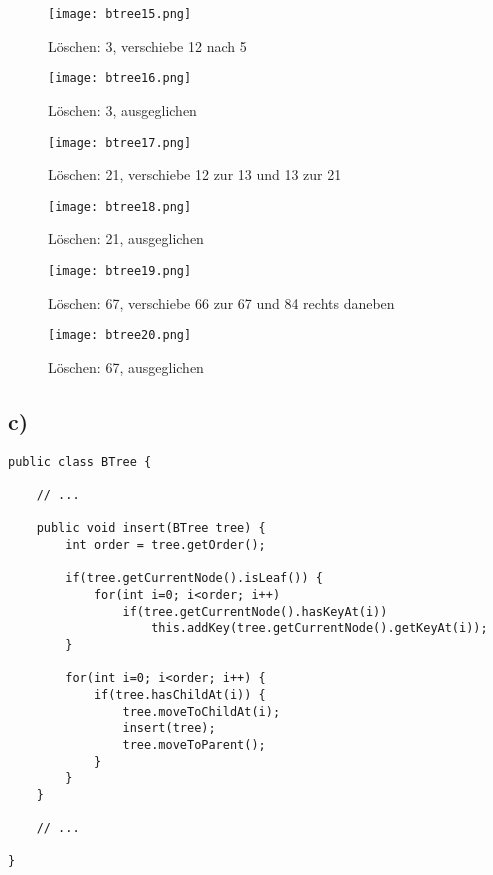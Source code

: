 \documentclass[a4paper]{article}
\begin{document}
\begin{figure}[!h]
	\begin{center}
		\texttt{[image: btree15.png]}
	\end{center}
	\caption{Löschen: 3, verschiebe 12 nach 5}
	\label{fig:btree15}
\end{figure}

\begin{figure}[!h]
	\begin{center}
		\texttt{[image: btree16.png]}
	\end{center}
	\caption{Löschen: 3, ausgeglichen}
	\label{fig:btree16}
\end{figure}

\begin{figure}[!h]
	\begin{center}
		\texttt{[image: btree17.png]}
	\end{center}
	\caption{Löschen: 21, verschiebe 12 zur 13 und 13 zur 21}
	\label{fig:btree17}
\end{figure}

\begin{figure}[!h]
	\begin{center}
		\texttt{[image: btree18.png]}
	\end{center}
	\caption{Löschen: 21, ausgeglichen}
	\label{fig:btree18}
\end{figure}

\begin{figure}[!h]
	\begin{center}
		\texttt{[image: btree19.png]}
	\end{center}
	\caption{Löschen: 67, verschiebe 66 zur 67 und 84 rechts daneben}
	\label{fig:btree19}
\end{figure}

\begin{figure}[!h]
	\begin{center}
		\texttt{[image: btree20.png]}
	\end{center}
	\caption{Löschen: 67, ausgeglichen}
	\label{fig:btree20}
\end{figure}

\clearpage
\subsection*{c)}

\begin{lstlisting}
public class BTree {

	// ...

	public void insert(BTree tree) {
		int order = tree.getOrder();

		if(tree.getCurrentNode().isLeaf()) {
			for(int i=0; i<order; i++)
				if(tree.getCurrentNode().hasKeyAt(i))
					this.addKey(tree.getCurrentNode().getKeyAt(i));
		}

		for(int i=0; i<order; i++) {
			if(tree.hasChildAt(i)) {
				tree.moveToChildAt(i);
				insert(tree);
				tree.moveToParent();
			}
		}
	}

	// ...

}

\end{lstlisting}
\end{document}
